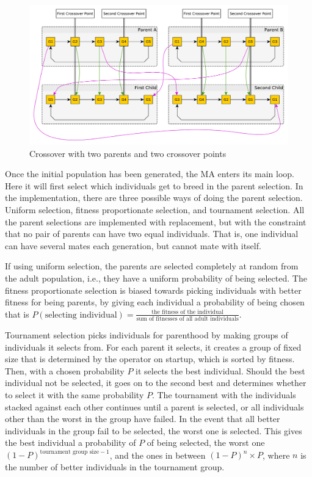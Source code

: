 \begin{figure}[thbp]
    \centerline{\includegraphics[width=\textwidth]{figures/Architecture/Crossover_Illustration.pdf}}
    \caption{Crossover with two parents and two crossover points}
    \label{fig:crossover_illustration}
\end{figure}

Once the initial population has been generated, the MA enters its main loop. Here it will first select which individuals get to breed in the parent selection. In the implementation, there are three possible ways of doing the parent selection. Uniform selection, fitness proportionate selection, and tournament selection. All the parent selections are implemented with replacement, but with the constraint that no pair of parents can have two equal individuals. That is, one individual can have several mates each generation, but cannot mate with itself.

If using uniform selection, the parents are selected completely at random from the adult population, i.e., they have a uniform probability of being selected. The fitness proportionate selection is biased towards picking individuals with better fitness for being parents, by giving each individual a probability of being chosen that is $P(\text{selecting individual}) = \frac{\text{the fitness of the individual}}{\text{sum of fitnesses of all adult individuals}}$.

Tournament selection picks individuals for parenthood by making groups of individuals it selects from. For each parent it selects, it creates a group of fixed size that is determined by the operator on startup, which is sorted by fitness. Then, with a chosen probability $P$ it selects the best individual. Should the best individual not be selected, it goes on to the second best and determines whether to select it with the same probability $P$. The tournament with the individuals stacked against each other continues until a parent is selected, or all individuals other than the worst in the group have failed. In the event that all better individuals in the group fail to be selected, the worst one is selected. This gives the best individual a probability of $P$ of being selected, the worst one $(1-P)^{\text{tournament group size}-1}$, and the ones in between $(1-P)^{n} \times P$, where $n$ is the number of better individuals in the tournament group.

